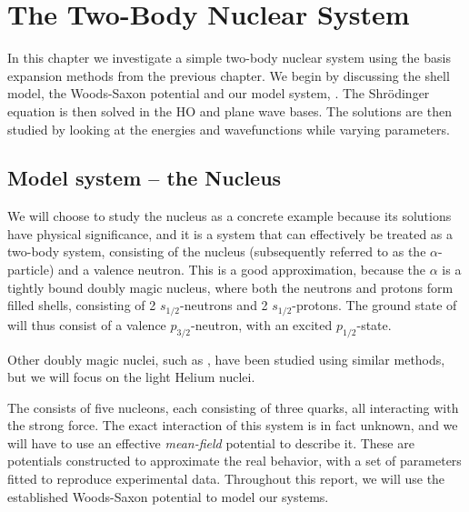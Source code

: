 \documentclass[../main/report.tex]{subfiles}
\begin{document}
  
\chapter{The Two-Body Nuclear System}
\label{cha:two-body}

In this chapter we investigate a simple two-body nuclear system using the basis expansion methods from the previous chapter.
We begin by discussing the shell model, the Woods-Saxon potential and our model system, . 
The Shrödinger equation is then solved in the HO and plane wave bases.
The solutions are then studied by looking at the energies and wavefunctions while varying parameters.

\section{Model system -- the  Nucleus}
We will choose to study the  nucleus as a concrete example because its solutions have physical significance, and it is a system that can effectively be treated as a two-body system, consisting of the  nucleus (subsequently referred to as the $\alpha$-particle) and a valence neutron. This is a good approximation, because the $\alpha$ is a tightly bound doubly magic nucleus, where both the neutrons and protons form filled shells, consisting of 2 $s_{1/2}$-neutrons and 2 $s_{1/2}$-protons. The ground state of  will thus consist of a valence $p_{3/2}$-neutron, with an excited $p_{1/2}$-state. 

Other doubly magic nuclei, such as , have been studied using similar methods\cite{gamow shell model 2008}, but we will focus on the light Helium nuclei.

The  consists of five nucleons, each consisting of three quarks, all interacting with the strong force. The exact interaction of this system is in fact unknown, and we will have to use an effective \emph{mean-field} potential to describe it. These are potentials constructed to approximate the real behavior, with a set of parameters fitted to reproduce experimental data. Throughout this report, we will use the established Woods-Saxon potential to model our systems.
 
\end{document}

